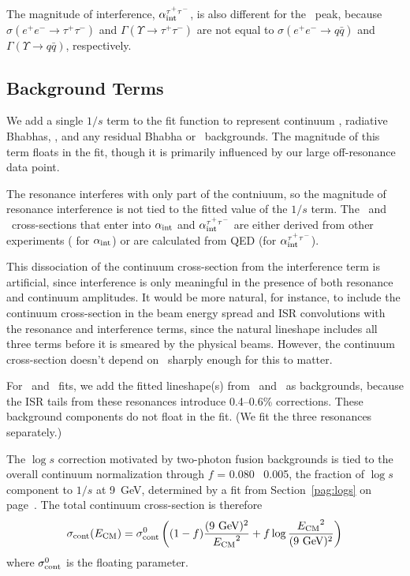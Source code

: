 \documentclass{cornell}
\begin{document}
The magnitude of interference, $\alpha_{\mbox{\scriptsize int}}^{\tau^+\tau^-}$, is also different
for the \tautau\ peak, because $\sigma(e^+e^- \to \tau^+\tau^-)$ and
$\Gamma(\Upsilon \to \tau^+\tau^-)$ are not equal to $\sigma(e^+e^-
\to q\bar{q})$ and $\Gamma(\Upsilon \to q\bar{q})$, respectively.

\subsection{Background Terms}

We add a single $1/s$ term to the fit function to represent continuum
\qqbar, radiative Bhabhas, \tautau, and any residual Bhabha or \mumu\
backgrounds.  The magnitude of this term floats in the fit, though it
is primarily influenced by our large off-resonance data point.

The resonance interferes with only part of the contniuum, so the
magnitude of resonance interference is not tied to the fitted value of
the $1/s$ term.  The \qqbar\ and \tautau\ cross-sections that enter
into $\alpha_{\mbox{\scriptsize int}}$ and $\alpha_{\mbox{\scriptsize int}}^{\tau^+\tau^-}$ are
either derived from other experiments (\cite{novor} for
$\alpha_{\mbox{\scriptsize int}}$) or are calculated from QED (for
$\alpha_{\mbox{\scriptsize int}}^{\tau^+\tau^-}$).

This dissociation of the continuum cross-section from the interference
term is artificial, since interference is only meaningful in the
presence of both resonance and continuum amplitudes.  It would be more
natural, for instance, to include the continuum cross-section in the
beam energy spread and ISR convolutions with the resonance and
interference terms, since the natural lineshape includes all three
terms before it is smeared by the physical beams.  However, the continuum
cross-section doesn't depend on \ecm\ sharply enough for this to
matter.

For \uss\ and \usss\ fits, we add the fitted lineshape(s) from \us\
and \uss\ as backgrounds, because the ISR tails from these resonances
introduce 0.4--0.6\% corrections.  These background components do not
float in the fit.  (We fit the three resonances separately.)

The $\log s$ correction motivated by two-photon fusion backgrounds is
tied to the overall continuum normalization through $f$ = 0.080 \PM\
0.005, the fraction of $\log s$ component to $1/s$ at 9~GeV,
determined by a fit from Section~\ref{pag:logs} on
page~\pageref{pag:logs}.  The total continuum cross-section is
therefore
\begin{equation}
  \sigma_{\mbox{\scriptsize cont}}(E_{\mbox{\scriptsize CM}}) = \sigma_{\mbox{\scriptsize cont}}^0 \left(
  (1-f) \frac{(\mbox{9~GeV})^2}{{E_{\mbox{\scriptsize CM}}}^2} +
  f \log\frac{{E_{\mbox{\scriptsize CM}}}^2}{(\mbox{9~GeV})^2} \right)
\end{equation}
where $\sigma_{\mbox{\scriptsize cont}}^0$ is the floating parameter.
\end{document}
